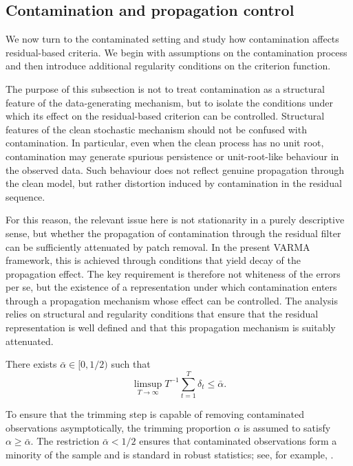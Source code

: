 \documentclass[12pt]{article}
\numberwithin{equation}{section}
\begin{document}
\subsection{Contamination and propagation control}\label{sec:contprop}

We now turn to the contaminated setting and study how contamination affects residual-based criteria. 
We begin with assumptions on the contamination process and then introduce additional regularity conditions on the criterion function.

The purpose of this subsection is not to treat contamination as a structural feature of the data-generating mechanism, but to isolate the conditions under which its effect on the residual-based criterion can be controlled. 
Structural features of the clean stochastic mechanism should not be confused with contamination.
In particular, even when the clean process has no unit root, contamination may generate spurious persistence or unit-root-like behaviour in the observed data. 
Such behaviour does not reflect genuine propagation through the clean model, but rather distortion induced by contamination in the residual sequence.

For this reason, the relevant issue here is not stationarity in a purely descriptive sense, but whether the propagation of contamination through the residual filter can be sufficiently attenuated by patch removal. 
In the present VARMA framework, this is achieved through conditions that yield decay of the propagation effect.
The key requirement is therefore not whiteness of the errors per se, but the existence of a representation under which contamination enters through a propagation mechanism whose effect can be controlled. 
The analysis relies on structural and regularity conditions that ensure that the residual representation is well defined and that this propagation mechanism is suitably attenuated.

\begin{assumption}\label{ass:outlier_rate}
There exists $\bar{\alpha} \in [0,1/2)$ such that
\begin{equation}
\limsup_{T\to\infty} T^{-1}\sum_{t=1}^T \delta_t \le \bar{\alpha}.
\end{equation}
\end{assumption}

To ensure that the trimming step is capable of removing contaminated observations asymptotically, the trimming proportion $\alpha$ is assumed to satisfy $\alpha \ge \bar{\alpha}$. 
The restriction $\bar{\alpha}<1/2$ ensures that contaminated observations form a minority of the sample and is standard in robust statistics; see, for example, \citet{Ro84}.
\end{document}

